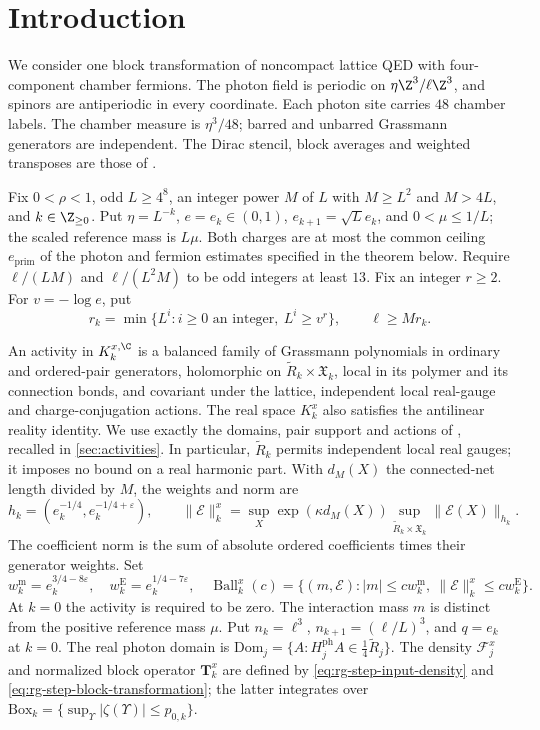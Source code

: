 \section{Introduction}\label{sec:introduction}

We consider one block transformation of noncompact lattice QED with
four-component chamber fermions. The photon field is periodic on
$\eta\Z^3/\ell\Z^3$, and spinors are antiperiodic in every coordinate.
Each photon site carries $48$ chamber labels. The chamber measure is
$\eta^3/48$; barred and unbarred Grassmann generators are independent.
The Dirac stencil, block averages and weighted transposes are those of
\cite[\S1]{FermionBlockManuscript}.

Fix \(0<\rho<1\), odd \(L\ge4^8\), an integer power \(M\) of \(L\) with \(M\ge L^2\) and \(M>4L\),
and \(k\in\Z_{\ge0}\). Put \(\eta=L^{-k}\), \(e=e_k\in(0,1)\),
\(e_{k+1}=\sqrt L e_k\), and \(0<\mu\le1/L\); the scaled reference
mass is \(L\mu\). Both charges are at most the common ceiling $e_{\mathrm{prim}}$ of the
photon and fermion estimates specified in the theorem below. Require
\(\ell/(LM)\) and \(\ell/(L^2M)\) to be odd integers at least \(13\).
Fix an integer \(r\ge2\). For \(v=-\log e\), put
\[
 r_k=\min\{L^i:i\ge0\text{ an integer},\ L^i\ge v^r\},
 \qquad \ell\ge Mr_k .
\]



An activity in $K_k^{x,\C}$ is a balanced family of Grassmann
polynomials in ordinary and ordered-pair generators, holomorphic on
$\widetilde R_k\times\mathfrak X_k$, local in its polymer and its
connection bonds, and covariant under the lattice, independent local
real-gauge and charge-conjugation actions. The real space $K_k^x$
also satisfies the antilinear reality identity. We use exactly the
domains, pair support and actions of \cite[\S2]{NormalizedContraction},
recalled in \cref{sec:activities}. In particular, $\widetilde R_k$
permits independent local real gauges; it imposes no bound on a real
harmonic part. With $d_M(X)$ the connected-net length divided by $M$,
the weights and norm are
\[
 h_k=(e_k^{-1/4},e_k^{-1/4+\varepsilon}),\qquad
 \|\mathscr E\|_k^x=\sup_X\exp(\kappa d_M(X))
       \sup_{\widetilde R_k\times\mathfrak X_k}\|\mathscr E(X)\|_{h_k}.
\]
The coefficient norm is the sum of absolute ordered coefficients
times their generator weights. Set
\begin{equation}\label{eq:rg-windows}
 w_k^{\mathrm m}=e_k^{3/4-8\varepsilon},\quad
 w_k^{\mathrm E}=e_k^{1/4-7\varepsilon},\quad
 \operatorname{Ball}_k^x(c)=
 \{(m,\mathscr E):|m|\le cw_k^{\mathrm m},\
                 \|\mathscr E\|_k^x\le cw_k^{\mathrm E}\}.
\end{equation}
At $k=0$ the activity is required to be zero. The interaction mass
$m$ is distinct from the positive reference mass $\mu$. Put
$n_k=\ell^3$, $n_{k+1}=(\ell/L)^3$, and $q=e_k$ at $k=0$.
The real photon domain is
$\mathrm{Dom}_j=\{A:H_j^{\mathrm{ph}}A\in\frac14\widetilde R_j\}$.
The density $\mathscr F_j^x$ and normalized block operator $\mathbf T_k^x$
are defined by \eqref{eq:rg-step-input-density} and
\eqref{eq:rg-step-block-transformation}; the latter integrates over
$\mathrm{Box}_k=\{\sup_\Upsilon|\zeta(\Upsilon)|\le p_{0,k}\}$.

